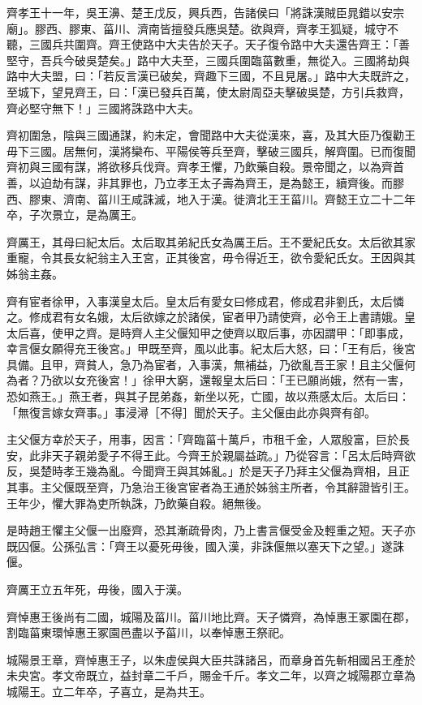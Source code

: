 \begin{pinyinscope}
齊孝王十一年，吳王濞、楚王戊反，興兵西，告諸侯曰「將誅漢賊臣晁錯以安宗廟」。膠西、膠東、菑川、濟南皆擅發兵應吳楚。欲與齊，齊孝王狐疑，城守不聽，三國兵共圍齊。齊王使路中大夫告於天子。天子復令路中大夫還告齊王：「善堅守，吾兵今破吳楚矣。」路中大夫至，三國兵圍臨菑數重，無從入。三國將劫與路中大夫盟，曰：「若反言漢已破矣，齊趣下三國，不且見屠。」路中大夫既許之，至城下，望見齊王，曰：「漢已發兵百萬，使太尉周亞夫擊破吳楚，方引兵救齊，齊必堅守無下！」三國將誅路中大夫。

齊初圍急，陰與三國通謀，約未定，會聞路中大夫從漢來，喜，及其大臣乃復勸王毋下三國。居無何，漢將欒布、平陽侯等兵至齊，擊破三國兵，解齊圍。已而復聞齊初與三國有謀，將欲移兵伐齊。齊孝王懼，乃飲藥自殺。景帝聞之，以為齊首善，以迫劫有謀，非其罪也，乃立孝王太子壽為齊王，是為懿王，續齊後。而膠西、膠東、濟南、菑川王咸誅滅，地入于漢。徙濟北王王菑川。齊懿王立二十二年卒，子次景立，是為厲王。

齊厲王，其母曰紀太后。太后取其弟紀氏女為厲王后。王不愛紀氏女。太后欲其家重寵，令其長女紀翁主入王宮，正其後宮，毋令得近王，欲令愛紀氏女。王因與其姊翁主姦。

齊有宦者徐甲，入事漢皇太后。皇太后有愛女曰修成君，修成君非劉氏，太后憐之。修成君有女名娥，太后欲嫁之於諸侯，宦者甲乃請使齊，必令王上書請娥。皇太后喜，使甲之齊。是時齊人主父偃知甲之使齊以取后事，亦因謂甲：「即事成，幸言偃女願得充王後宮。」甲既至齊，風以此事。紀太后大怒，曰：「王有后，後宮具備。且甲，齊貧人，急乃為宦者，入事漢，無補益，乃欲亂吾王家！且主父偃何為者？乃欲以女充後宮！」徐甲大窮，還報皇太后曰：「王已願尚娥，然有一害，恐如燕王。」燕王者，與其子昆弟姦，新坐以死，亡國，故以燕感太后。太后曰：「無復言嫁女齊事。」事浸潯［不得］聞於天子。主父偃由此亦與齊有卻。

主父偃方幸於天子，用事，因言：「齊臨菑十萬戶，市租千金，人眾殷富，巨於長安，此非天子親弟愛子不得王此。今齊王於親屬益疏。」乃從容言：「呂太后時齊欲反，吳楚時孝王幾為亂。今聞齊王與其姊亂。」於是天子乃拜主父偃為齊相，且正其事。主父偃既至齊，乃急治王後宮宦者為王通於姊翁主所者，令其辭證皆引王。王年少，懼大罪為吏所執誅，乃飲藥自殺。絕無後。

是時趙王懼主父偃一出廢齊，恐其漸疏骨肉，乃上書言偃受金及輕重之短。天子亦既囚偃。公孫弘言：「齊王以憂死毋後，國入漢，非誅偃無以塞天下之望。」遂誅偃。

齊厲王立五年死，毋後，國入于漢。

齊悼惠王後尚有二國，城陽及菑川。菑川地比齊。天子憐齊，為悼惠王冢園在郡，割臨菑東環悼惠王冢園邑盡以予菑川，以奉悼惠王祭祀。

城陽景王章，齊悼惠王子，以朱虛侯與大臣共誅諸呂，而章身首先斬相國呂王產於未央宮。孝文帝既立，益封章二千戶，賜金千斤。孝文二年，以齊之城陽郡立章為城陽王。立二年卒，子喜立，是為共王。


\end{pinyinscope}
